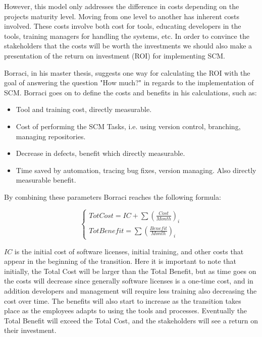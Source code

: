 \documentclass[10pt]{article}
\begin{document}
\noindent However, this model only addresses the difference in costs depending on the projects maturity level. Moving from one level to another has inherent costs involved. These costs involve both cost for tools, educating developers in the tools, training managers for handling the systems, etc. In order to convince the stakeholders that the costs will be worth the investments we should also make a presentation of the return on investment (ROI) for implementing SCM.

\noindent Borraci\cite{Borraci}, in his master thesis, suggests one way for calculating the ROI with the goal of answering the question "How much?" in regards to the implementation of SCM. Borraci goes on to define the costs and benefits in his calculations, such as:
\begin{itemize}
\item Tool and training cost, directly measurable.
\item Cost of performing the SCM Tasks, i.e. using version control, branching, managing repositories. 
\item Decrease in defects, benefit which directly measurable.
\item Time saved by automation, tracing bug fixes, version managing. Also directly measurable benefit. \\
\end{itemize}

\noindent By combining these parameters Borraci reaches the following formula:

\begin{equation}
\begin{cases}
TotCost = IC + \sum(\frac{Cost}{Month})_i\\
TotBenefit = \sum(\frac{Benefit}{Month})_i
\end{cases}
\end{equation}

\noindent $IC$ is the initial cost of software licenses, initial training, and other costs that appear in the beginning of the transition. Here it is important to note that initially, the Total Cost will be larger than the Total Benefit, but as time goes on the costs will decrease since generally software licenses is a one-time cost, and in addition developers and management will require less training also decreasing the cost over time. The benefits will also start to increase as the transition takes place as the employees adapts to using the tools and processes. Eventually the Total Benefit will exceed the Total Cost, and the stakeholders will see a return on their investment. 
\end{document}
